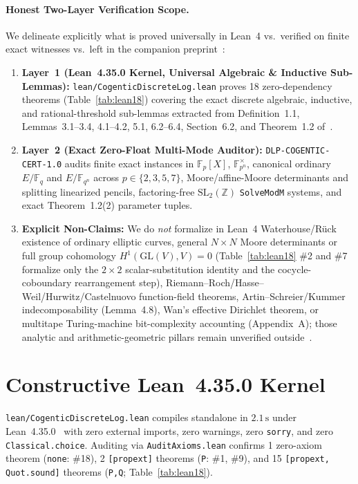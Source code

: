 \documentclass[10pt,twocolumn]{article}
\newcommand{\FF}{\mathbb{F}}
\newcommand{\ZZ}{\mathbb{Z}}
\begin{document}
\paragraph{Honest Two-Layer Verification Scope.}
We delineate explicitly what is proved universally in Lean~4 vs.\ verified on finite exact witnesses vs.\ left in the companion preprint~\cite{cogentic2026dlp}:
\begin{enumerate}[leftmargin=1.2em,itemsep=1pt,topsep=2pt]
  \item \textbf{Layer~1 (Lean~4.35.0 Kernel, Universal Algebraic \& Inductive Sub-Lemmas):} \nolinkurl{lean/CogenticDiscreteLog.lean} proves 18 zero-dependency theorems (Table~\ref{tab:lean18}) covering the exact discrete algebraic, inductive, and rational-threshold sub-lemmas extracted from Definition~1.1, Lemmas~3.1--3.4, 4.1--4.2, 5.1, 6.2--6.4, Section~6.2, and Theorem~1.2 of~\cite{cogentic2026dlp}.
  \item \textbf{Layer~2 (Exact Zero-Float Multi-Mode Auditor):} \nolinkurl{DLP-COGENTIC-CERT-1.0} audits finite exact instances in $\FF_p[X]$, $\FF_{p^n}^\times$, canonical ordinary $E/\FF_q$ and $E/\FF_{q^n}$ across $p\in\{2,3,5,7\}$, Moore/affine-Moore determinants and splitting linearized pencils, factoring-free $\mathrm{SL}_2(\ZZ)$ \texttt{SolveModM} systems, and exact Theorem~1.2(2) parameter tuples.
  \item \textbf{Explicit Non-Claims:} We do \emph{not} formalize in Lean~4 Waterhouse\slash R\"uck existence of ordinary elliptic curves, general $N{\times}N$ Moore determinants or full group cohomology $H^1(\mathrm{GL}(V),V)=0$ (Table~\ref{tab:lean18} \#2 and \#7 formalize only the $2{\times}2$ scalar-substitution identity and the cocycle-coboundary rearrangement step), Riemann--Roch\slash Hasse--Weil\slash Hurwitz\slash Castelnuovo function-field theorems, Artin--Schreier\slash Kummer indecomposability (Lemma~4.8), Wan's effective Dirichlet theorem, or multitape Turing-machine bit-complexity accounting (Appendix~A); those analytic and arithmetic-geometric pillars remain unverified outside~\cite{cogentic2026dlp}.
\end{enumerate}

\section{Constructive Lean~4.35.0 Kernel}\label{sec:lean}
\nolinkurl{lean/CogenticDiscreteLog.lean} compiles standalone in $2.1\,\mathrm{s}$ under Lean~4.35.0~\cite{demoura2021lean4} with zero external imports, zero warnings, zero \texttt{sorry}, and zero \texttt{Classical.choice}. Auditing via \nolinkurl{AuditAxioms.lean} confirms 1 zero-axiom theorem (\texttt{none}: \#18), 2 \texttt{[propext]} theorems (\texttt{P}: \#1, \#9), and 15 \texttt{[propext, Quot.sound]} theorems (\texttt{P,Q}; Table~\ref{tab:lean18}).
\end{document}
